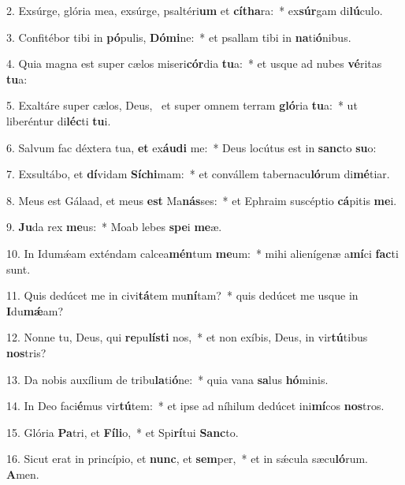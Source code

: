 2. Exsúrge, glória mea, exsúrge, psaltéri\textbf{um} et \textbf{cí}\textbf{tha}ra:~*  ex\textbf{súr}gam di\textbf{lú}culo.\

3. Confitébor tibi in \textbf{pó}pulis, \textbf{Dó}\textbf{mi}ne:~*  et psallam tibi in \textbf{na}ti\textbf{ó}nibus.\

4. Quia magna est super cælos miseri\textbf{cór}dia \textbf{tu}a:~*  et usque ad nubes \textbf{vé}ritas \textbf{tu}a:\

5. Exaltáre super cælos, Deus, \dag\  et super omnem terram \textbf{gló}ria \textbf{tu}a:~*  ut liberéntur di\textbf{léc}ti \textbf{tu}i.\

6. Salvum fac déxtera tua, \textbf{et} ex\textbf{áu}\textbf{di} me:~*  Deus locútus est in \textbf{sanc}to \textbf{su}o:\

7. Exsultábo, et \textbf{dí}vidam \textbf{Sí}\textbf{chi}mam:~*  et convállem tabernacu\textbf{ló}rum di\textbf{mé}tiar.\

8. Meus est Gálaad, et meus \textbf{est} Ma\textbf{nás}ses:~*  et Ephraim suscéptio \textbf{cá}pitis \textbf{me}i.\

9. \textbf{Ju}da rex \textbf{me}us:~*  Moab lebes \textbf{spe}i \textbf{me}æ.\

10. In Idumǽam exténdam calcea\textbf{mén}tum \textbf{me}um:~*  mihi alienígenæ a\textbf{mí}ci \textbf{fac}ti sunt.\

11. Quis dedúcet me in civi\textbf{tá}tem mu\textbf{ní}tam?~*  quis dedúcet me usque in \textbf{I}du\textbf{mǽ}am?\

12. Nonne tu, Deus, qui \textbf{re}pu\textbf{lís}\textbf{ti} nos,~*  et non exíbis, Deus, in vir\textbf{tú}tibus \textbf{nos}tris?\

13. Da nobis auxílium de tribu\textbf{la}ti\textbf{ó}ne:~*  quia vana \textbf{sa}lus \textbf{hó}minis.\

14. In Deo faci\textbf{é}mus vir\textbf{tú}tem:~*  et ipse ad níhilum dedúcet ini\textbf{mí}cos \textbf{nos}tros.\

15. Glória \textbf{Pa}tri, et \textbf{Fí}\textbf{li}o,~*  et Spi\textbf{rí}tui \textbf{Sanc}to.\

16. Sicut erat in princípio, et \textbf{nunc}, et \textbf{sem}per,~*  et in sǽcula sæcu\textbf{ló}rum. \textbf{A}men.\

